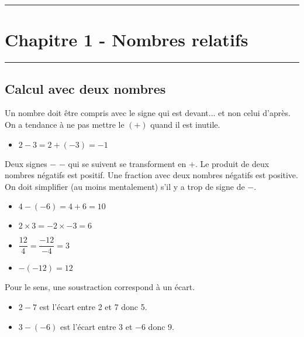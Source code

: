 \documentclass[12pt]{article}
\newcommand{\horrule}[1]{\rule{\linewidth}{#1}} %
\begin{document}

\newtheorem{Definition}{Définition}
\newtheorem{Theorem}{Théorème}
\newtheorem{Proposition}{Propriété}

\renewcommand{\labelitemi}{$\bullet$}
\renewcommand{\labelitemii}{$\circ$}

\setlength{\columnseprule}{1pt}

\horrule{2px}
\section*{Chapitre 1 - Nombres relatifs}
\horrule{2px}

\subsection*{Calcul avec deux nombres}

Un nombre doit être compris avec le signe qui est devant... et non celui d'après. On a tendance à ne pas mettre le $(+)$ quand il est inutile.

\begin{itemize}
\item $2 - 3 = 2 + (-3) = -1$
\end{itemize}

Deux signes $-$ $-$ qui se suivent se transforment en $+$. Le produit de deux nombres négatifs est positif. Une fraction avec deux nombres négatifs est positive. On doit simplifier (au moins mentalement) s'il y a trop de signe de $-$. 

\begin{itemize}
\item $4- (-6) =  4 + 6 = 10$
\item $2 \times 3 = -2 \times  -3 = 6 $ 
\item $\dfrac{12}{4} = \dfrac{-12}{-4} = 3 $
\item $- (-12) = 12$
\end{itemize} 
  
Pour le sens, une soustraction correspond à un écart.

\begin{itemize}
\item $2 - 7$ est l'écart entre 2 et 7 donc 5.
\item $3 - (-6)$ est l'écart entre 3 et $-6$ donc 9.
\end{itemize}
\end{document}
